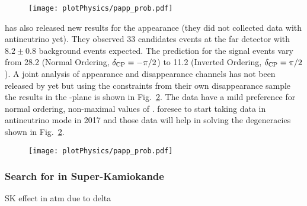 \begin{figure} [h!]
\begin{center}
\texttt{[image: plotPhysics/papp\_prob.pdf]}
\caption{\label{fig:t2kdcp}  }
\end{center}
\end{figure}

 
\nova has also released new results for the \nue appearance (they did not collected data with antineutrino yet). They observed 33 \nue candidates events at the far detector with $8.2\pm0.8$ background events expected. The prediction for the signal events vary from 28.2 (Normal Ordering, $\delta_{\mathrm{CP}}=-\pi/2$) to 11.2 (Inverted Ordering, $\delta_{\mathrm{CP}}=\pi/2$). A joint analysis of appearance and disappearance channels has not been released by \nova yet but using the constraints from their own disappearance sample the results in the \stt-\dcp plane is shown in Fig.~\ref{fig:novadcp}. The data have a mild preference for normal ordering, non-maximal values of \stt. \nova foresee to start taking data in antineutrino mode in 2017 and those data will help in solving the degeneracies shown in Fig.~\ref{fig:novadcp}. 

\begin{figure} [h!]
\begin{center}
\texttt{[image: plotPhysics/papp\_prob.pdf]}
\caption{\label{fig:novadcp}  }
\end{center}
\end{figure}



\subsubsection{ Search for \dcp in Super-Kamiokande}
SK effect in atm due to delta
